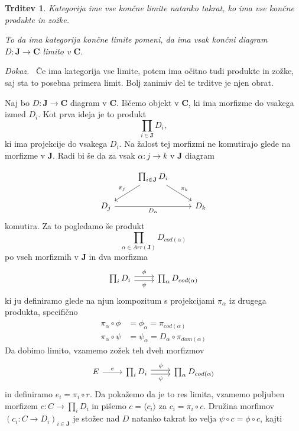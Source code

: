 \documentclass[12pt,a4paper]{book}
\theoremstyle{definition}
\theoremstyle{plain}
\newtheorem{trditev}[definicija]{Trditev}
\newenvironment{dokaz}{\emph{Dokaz.}\ }{\hspace{\fill}{$\Box$}}
\theoremstyle{definition}
\theoremstyle{remark}
\newcommand{\cat}[1]{\textbf{#1}}
\begin{document}
\begin{trditev} \label{konstrukcija limit}
Kategorija ime vse \textit{končne limite} natanko takrat, ko ima vse končne produkte in zožke.

To da ima kategorija končne limite pomeni, da ima vsak končni diagram $D : \cat{J} \to \cat{C}$ limito v $\cat{C}$.

\end{trditev}
\begin{dokaz}
Če ima kategorija vse limite, potem ima očitno tudi produkte in zožke, saj sta to posebna primera limit. Bolj zanimiv del te trditve je njen obrat.

Naj bo $D : \cat{J} \to \cat{C}$ diagram v $\cat{C}$. Iščemo objekt v $\cat{C}$, ki ima morfizme do vsakega izmed $D_i$. Kot prva ideja je to produkt 
$$\prod_{i \in \cat{J}}D_i,$$
ki ima projekcije do vsakega $D_i$. Na žalost tej morfizmi ne komutirajo glede na morfizme v $\cat{J}$. Radi bi še da za vsak $\alpha : j \to k$ v $\cat{J}$ diagram

$$ \begin{tikzcd}
& \prod_{i \in \cat{J}}D_i \ar[dl, "\pi_j"'] \ar[dr, "\pi_k"] & \\
D_j \ar[rr, "D_\alpha"'] && D_k
\end{tikzcd} $$
komutira. Za to pogledamo še produkt 
$$ \prod_{\alpha \in Arr(\cat{J})} D_{cod(\alpha)} $$
po vseh morfizmih v $\cat{J}$ in dva morfizma
$$ \begin{tikzcd}[sep=normal]
\prod_{i }D_i \ar[r, shift left, "\phi"] \ar[r, shift right, "\psi"'] & \prod_{\alpha } D_{cod(\alpha)}
\end{tikzcd} $$
ki ju definiramo glede na njun kompozitum s projekcijami $\pi_\alpha$ iz drugega produkta, specifično
\begin{align*}
\pi_\alpha \circ \phi &= \phi_\alpha = \pi_{cod(\alpha)} \\
\pi_\alpha \circ \psi &= \psi_\alpha = D_\alpha \circ \pi_{dom(\alpha)}
\end{align*}
Da dobimo limito, vzamemo zožek teh dveh morfizmov
$$ \begin{tikzcd}[sep=normal]
E \ar[r, "e"] & \prod_{i }D_i \ar[r, shift left, "\phi"] \ar[r, shift right, "\psi"'] & \prod_{\alpha } D_{cod(\alpha)}
\end{tikzcd} $$
in definiramo $e_i = \pi_i \circ r$. Da pokažemo da je to res limita, vzamemo poljuben morfizem $c : C \to \prod_i D_i$ in pišemo $c = \langle c_i \rangle$ za $c_i = \pi_i \circ c$. Družina morfimov $(c_i : C \to D_i)_{i \in \cat{J}}$ je stožec nad $D$ natanko takrat ko velja $\psi \circ c = \phi \circ c$, kajti


\end{dokaz}
\end{document}
